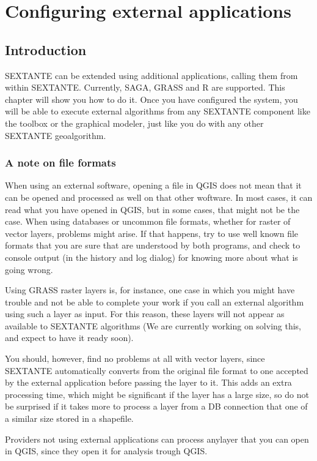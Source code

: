 \chapter{Configuring external applications}

\section{Introduction}

SEXTANTE can be extended using additional applications, calling them from within SEXTANTE. Currently, SAGA, GRASS and R are supported. This chapter will show you how to do it. Once you have configured the system, you will be able to execute external algorithms from any SEXTANTE component like the toolbox or the graphical modeler, just like you do with any other SEXTANTE geoalgorithm.

\subsection{A note on file formats}

When using an external software, opening a file in QGIS does not mean that it can be opened and processed as well on that other woftware. In most cases, it can read what you have opened in QGIS, but in some cases, that might not be the case. When using databases or uncommon file formats, whether for raster of vector layers, problems might arise. If that happens, try to use well known file formats that you are sure that are understood by both programs, and check to console output (in the history and log dialog) for knowing more about what is going wrong.

Using GRASS raster layers is, for instance, one case in which you might have trouble and not be able to complete your work if you call an external algorithm using such a layer as input. For this reason, these layers will not appear as available to SEXTANTE algorithms (We are currently working on solving this, and expect to have it ready soon).

You should, however, find no problems at all with vector layers, since SEXTANTE automatically converts from the original file format to one accepted by the external application before passing the layer to it. This adds an extra processing time, which might be significant if the layer has a large size, so do not be surprised if it takes more to process a layer from a DB connection that one of a similar size stored in a shapefile.

Providers not using external applications can process anylayer that you can open in QGIS, since they open it for analysis trough QGIS.

